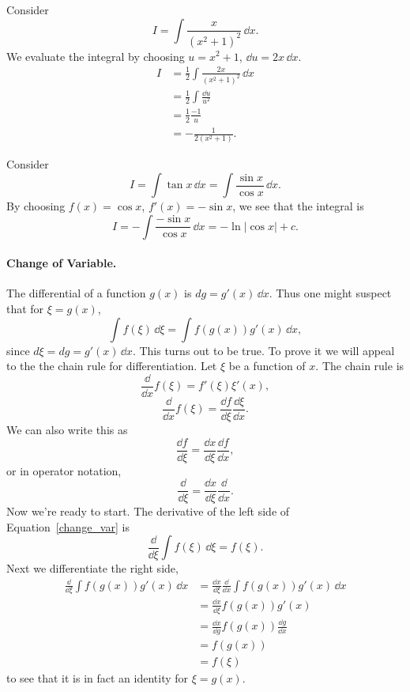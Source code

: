 \begin{Example}
  Consider
  \[
  I = \int \frac{x}{(x^2 + 1)^2} \,\dd x.
  \]
  We evaluate the integral by choosing $u = x^2 + 1$, $\dd u = 2 x \,\dd x$.
  \begin{align*}
    I &= \frac{1}{2} \int \frac{2 x}{(x^2 + 1)^2} \,\dd x \\
    &= \frac{1}{2} \int \frac{\dd u}{u^2} \\
    &= \frac{1}{2} \frac{-1}{u} \\
    &= - \frac{1}{2 (x^2+1) }.
  \end{align*}
\end{Example}





\begin{Example}
  Consider
  \[
  I = \int \tan x \,\dd x = \int \frac{\sin x}{\cos x} \,\dd x.
  \]
  By choosing $f(x) = \cos x$, $f'(x) = - \sin x$, we see that the integral is
  \[
  I = - \int \frac{-\sin x}{\cos x} \,\dd x = - \ln | \cos x | + c.
  \]
\end{Example}



\paragraph{Change of Variable.}
The differential of a function $g(x)$ is $d g = g'(x) \,\dd x$.  Thus one 
might suspect that for $\xi = g(x)$, 
\begin{equation}
  \label{change_var}
  \int f(\xi) \,\dd \xi = \int f(g(x)) g'(x) \,\dd x,
\end{equation}
since $d\xi = d g = g'(x)\,\dd x$.  This turns out to be true.  To prove it
we will appeal to the the chain rule for differentiation.  Let $\xi$ be 
a function of $x$.  The chain rule is
\[
\frac{\dd}{\dd x} f(\xi) = f'(\xi) \xi'(x),
\]
\[
\frac{\dd}{\dd x} f(\xi) = \frac{\dd f}{\dd \xi} \frac{\dd \xi}{\dd x}.
\]
We can also write this as
\[
\frac{\dd f}{\dd \xi} = \frac{\dd x}{\dd \xi} \frac{\dd f}{\dd x},
\]
or in operator notation,
\[
\frac{\dd}{\dd \xi} = \frac{\dd x}{\dd \xi} \frac{\dd}{\dd x}.
\]
Now we're ready to start.  The derivative of the left side of
Equation~\ref{change_var} is
\[
\frac{\dd}{\dd \xi} \int f(\xi) \,\dd \xi = f(\xi).
\]
Next we differentiate the right side,
\begin{align*}
  \frac{\dd}{\dd \xi} \int f(g(x)) g'(x) \,\dd x
  &= \frac{\dd x}{\dd \xi} \frac{\dd}{\dd x} \int f(g(x)) g'(x) \,\dd x \\
  &= \frac{\dd x}{\dd \xi} f(g(x)) g'(x) \\
  &= \frac{\dd x}{\dd g} f(g(x)) \frac{\dd g}{\dd x} \\
  &= f(g(x)) \\
  &= f(\xi)
\end{align*}
to see that it is in fact an identity for $\xi = g(x)$.





